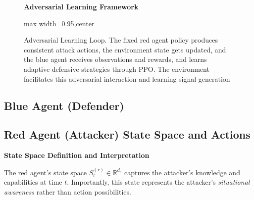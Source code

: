 \documentclass[12pt,oneside]{article}
\begin{document}
\begin{figure}[H]
\centering
\textbf{Adversarial Learning Framework}
\medskip
\begin{adjustbox}{max width=0.95\linewidth,center}
\end{adjustbox}
\caption{Adversarial Learning Loop. The fixed red agent policy produces consistent attack actions, the environment state gets updated, and the blue agent receives observations and rewards, and learns adaptive defensive strategies through PPO. The environment facilitates this adversarial interaction and learning signal generation }
\label{fig:adversarial_framework}
\end{figure}

\subsection{Blue Agent (Defender)}

\subsection{Red Agent (Attacker) State Space and Actions}

\textbf{State Space Definition and Interpretation}

The red agent's state space $S^{(r)}_t \in \mathbb{R}^{d_r}$ captures the attacker's knowledge and capabilities at time $t$. Importantly, this state represents the attacker's \textit{situational awareness} rather than action possibilities.
\end{document}
